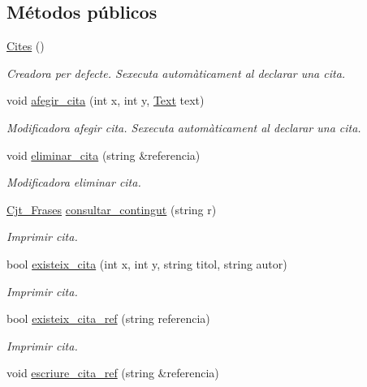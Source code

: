 \subsection*{Métodos públicos}
\begin{DoxyCompactItemize}
\item 
\hyperlink{class_cites_aef7c40360c5537b4dac136a758e815fc}{Cites} ()
\begin{DoxyCompactList}\small\item\em Creadora per defecte. S\textquotesingle{}executa automàticament al declarar una cita. \end{DoxyCompactList}\item 
void \hyperlink{class_cites_ac39a9d48653f5cbd3e6b49dd9174035f}{afegir\+\_\+cita} (int x, int y, \hyperlink{class_text}{Text} text)
\begin{DoxyCompactList}\small\item\em Modificadora afegir cita. S\textquotesingle{}executa automàticament al declarar una cita. \end{DoxyCompactList}\item 
void \hyperlink{class_cites_a4abd76ae9a2cf1883a4ca233b7f6879e}{eliminar\+\_\+cita} (string \&referencia)
\begin{DoxyCompactList}\small\item\em Modificadora eliminar cita. \end{DoxyCompactList}\item 
\hyperlink{class_cjt___frases}{Cjt\+\_\+\+Frases} \hyperlink{class_cites_aaed19239876da7b34636457a0641c7e4}{consultar\+\_\+contingut} (string r)
\begin{DoxyCompactList}\small\item\em Imprimir cita. \end{DoxyCompactList}\item 
bool \hyperlink{class_cites_a4a084e0d91b69314dc14fc4b5974595f}{existeix\+\_\+cita} (int x, int y, string titol, string autor)
\begin{DoxyCompactList}\small\item\em Imprimir cita. \end{DoxyCompactList}\item 
bool \hyperlink{class_cites_ac80a9416a25f61d4a708ea13aad20da9}{existeix\+\_\+cita\+\_\+ref} (string referencia)
\begin{DoxyCompactList}\small\item\em Imprimir cita. \end{DoxyCompactList}\item 
void \hyperlink{class_cites_a91f8acd21c6867250f1ef4f4e4b32adb}{escriure\+\_\+cita\+\_\+ref} (string \&referencia)

\end{DoxyCompactItemize}
